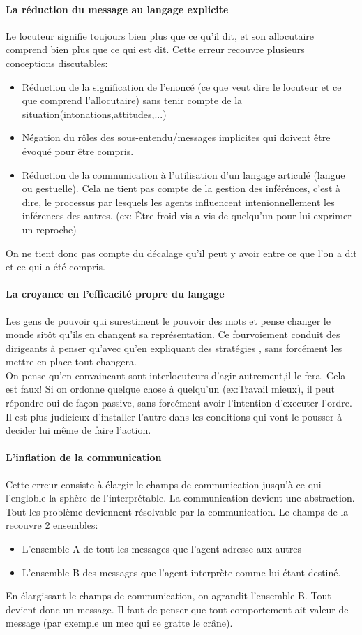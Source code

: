 \documentclass[11pt]{article} %
\begin{document}
		\paragraph{La réduction du message au langage explicite}  Le locuteur signifie toujours bien plus que ce qu'il dit, et son allocutaire comprend bien plus que ce qui est dit. Cette erreur recouvre plusieurs conceptions discutables:
		\begin{itemize}
			\item Réduction de la signification de l'enoncé (ce que veut dire le locuteur et ce que comprend 
			l'allocutaire) sans tenir compte de la situation(intonations,attitudes,...)
			\item Négation du rôles des sous-entendu/messages implicites qui doivent être évoqué pour
		être compris.
			\item Réduction de la communication à l'utilisation d'un langage articulé (langue ou gestuelle). 
			Cela ne tient pas compte de la gestion des inférénces, c'est à dire, le processus par lesquels
			les agents influencent intenionnellement les inférences des autres. (ex: Être froid vis-a-vis de 
			quelqu'un pour lui exprimer un reproche) 
		\end{itemize} 
		On ne tient donc pas compte du décalage qu'il peut y avoir entre ce que l'on a dit et ce qui a été 
		compris.
		\paragraph{La croyance en l'efficacité propre du langage} Les gens de pouvoir qui surestiment le 
		pouvoir des mots et pense changer le monde sitôt qu'ils en changent sa représentation. Ce 
		fourvoiement conduit des dirigeants à penser qu'avec qu'en expliquant des stratégies , sans forcément 
		les mettre en place tout changera.\\
		On pense qu'en convaincant sont interlocuteurs d'agir autrement,il le fera. Cela est faux! Si on ordonne
		quelque chose à quelqu'un (ex:Travail mieux), il peut répondre oui de façon passive, sans forcément 
		avoir l'intention d'executer l'ordre. Il est plus judicieux d'installer l'autre dans les conditions qui vont le 
		pousser à decider lui même de faire l'action. 
		\paragraph{L'inflation de la communication} Cette erreur consiste à élargir le champs de 
		communication jusqu'à ce qui l'engloble la sphère de l'interprétable. La communication devient une 
		abstraction. Tout les problème deviennent résolvable par la communication.  Le champs de la recouvre 
		2 ensembles:
		\begin{itemize}
			\item L'ensemble A de tout les messages que l'agent adresse aux autres
			\item L'ensemble B des messages que l'agent interprète comme lui étant destiné. 
		\end{itemize}
		En élargissant le champs de communication, on agrandit l'ensemble B. Tout devient donc un message.
		 Il faut de penser que tout comportement ait valeur de message (par exemple un mec qui se gratte le 
		 crâne).
\end{document}
